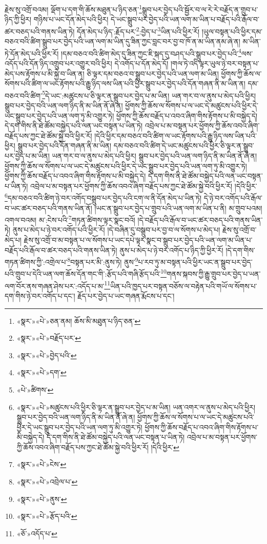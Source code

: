 རྗེས་སུ་འགྲོ་བའམ། ལྡོག་པ་དག་གི་ཆོས་མཐུན་པ་ཉིད་ཅན་\footnote{«སྣར་»«པེ་»ཅན་ནམ། ཆོས་མི་མཐུན་པ་ཉིད་ཅན་}སྒྲུབ་པར་བྱེད་པའི་སྦྱོར་བ་ལ་རེ་རེ་བརྗོད་ན་གྲུབ་པ་ཉིད་ཀྱི་ཕྱིར། གཉིས་པ་ཡང་དོན་མེད་པའི་ཕྱིར། དེ་ཡང་སྒྲུབ་པར་བྱེད་པའི་ཡན་ལག་མ་ཡིན་པ་བརྗོད་པའི་རྒོལ་བ་ཚར་བཅད་པའི་གནས་ཡིན་ཏེ། དོན་མེད་པ་ཉིད་:རྗོད་པར་\footnote{«སྣར་»«པེ་»བརྗོད་པར་}:བྱེད་པ་\footnote{«སྣར་»«པེ་»བྱེད་པའི་}ཡིན་པའི་ཕྱིར་རོ། །ཡུལ་བསྟན་པའི་ཕྱིར་དམ་བཅའ་བའི་ཚིག་སྒྲུབ་པར་བྱེད་པའི་ཡན་ལག་མ་ཡིན་དུ་ཟིན་ཀྱང་བླང་བར་བྱ་བ་ཁོ་ན་མ་ཡིན་ནམ་ཞེ་ན། མ་ཡིན་ཏེ་དོན་མེད་པའི་ཕྱིར་རོ། །དམ་བཅའ་བའི་ཚིག་མེད་དུ་ཟིན་ཀྱང་ཇི་སྐད་དུ་བཤད་པའི་སྒྲུབ་པར་བྱེད་པའི་\footnote{«སྣར་»«པེ་»དག་}ལས་འདོད་པའི་དོན་ཉིད་འགྲུབ་པར་འགྱུར་བའི་ཕྱིར། དེ་འགོད་པ་དོན་མེད་དོ། །གལ་ཏེ་འདི་ལྟར་ཡུལ་ཉེ་བར་བསྟན་པ་མེད་པས་རྟོགས་པ་མི་སྐྱེ་བ་ཡིན་ན། ཅི་ལྟར་དམ་བཅའ་བ་སྒྲུབ་པར་བྱེད་པའི་ཡན་ལག་མ་ཡིན། ཕྱོགས་ཀྱི་ཆོས་ལ་སོགས་པའི་ཚིག་ལ་ཡང་རྟོགས་པའི་རྒྱུ་ཉིད་ལས་ཡིན་པའི་ཕྱིར་སྒྲུབ་པར་བྱེད་པའི་དོན་གཞན་ནི་མ་ཡིན་ན། དམ་བཅའ་བའི་ཚིག་\footnote{«པེ་»ཚིགས་}དེ་ཡང་:མཚུངས་པ་ཅི་ལྟར་ན་སྒྲུབ་པར་བྱེད་པ་མ་ཡིན། ཡན་གར་བ་ལ་ནུས་པ་མེད་པའི་ཕྱིར། སྒྲུབ་པར་བྱེད་བའི་ཡན་ལག་ཉིད་ནི་མ་ཡིན་ནོ་ཞེ་ན། ཕྱོགས་ཀྱི་ཆོས་ལ་སོགས་པ་ལ་ཡང་དེ་མཚུངས་པའི་ཕྱིར་དེ་ཡང་སྒྲུབ་པར་བྱེད་པའི་ཡན་ལག་ཏུ་མི་འགྱུར་ཏེ། ཕྱོགས་ཀྱི་ཆོས་བརྗོད་པ་འབའ་ཞིག་གིས་རྟོགས་པ་མི་བསྐྱེད་དེ། དེ་དག་གིས་ནི་ཐེ་ཚོམ་བསྐྱེད་པའི་ལན་ཡང་བསྟན་པ་ཡིན་ཏེ། འབྲེལ་པ་མ་བསྟན་པར་ཕྱོགས་ཀྱི་ཆོས་འབའ་ཞིག་བརྗོད་པས་ཀྱང་ཐེ་ཚོམ་སྐྱེ་བའི་ཕྱིར་རོ། །དེའི་ཕྱིར་དམ་བཅའ་བའི་ཚིག་ལ་ཡང་རྟོགས་པའི་རྒྱུ་ཉིད་ལས་ཡིན་པའི་ཕྱིར། སྒྲུབ་པར་བྱེད་པའི་དོན་གཞན་ནི་མ་ཡིན། དམ་བཅའ་བའི་ཚིག་དེ་ཡང་མཚུངས་པའི་ཕྱིར་ཅི་ལྟར་ན་སྒྲུབ་པར་བྱེད་པ་མ་ཡིན། ཡན་གར་བ་ལ་ནུས་པ་མེད་པའི་ཕྱིར། སྒྲུབ་པར་བྱེད་པའི་ཡན་ལག་ཉིད་ནི་མ་ཡིན་ནོ་ཞེ་ན། ཕྱོགས་ཀྱི་ཆོས་ལ་སོགས་པ་ལ་ཡང་དེ་མཚུངས་པའི་ཕྱིར་དེ་ཡང་སྒྲུབ་པར་བྱེད་པའི་ཡན་ལག་ཏུ་མི་འགྱུར་ཏེ། ཕྱོགས་ཀྱི་ཆོས་བརྗོད་པ་འབའ་ཞིག་གིས་རྟོགས་པ་མི་བསྐྱེད་དེ། དེ་དག་གིས་ནི་ཐེ་ཚོམ་བསྐྱེད་པའི་ལན་ཡང་བསྟན་པ་ཡིན་ཏེ། འབྲེལ་པ་མ་བསྟན་པར་ཕྱོགས་ཀྱི་ཆོས་འབའ་ཞིག་བརྗོད་པས་ཀྱང་ཐེ་ཚོམ་སྐྱེ་བའི་ཕྱིར་རོ། །དེའི་ཕྱིར་\footnote{«སྣར་»«པེ་»མཚུངས་པའི་ཕྱིར་ཅི་ལྟར་ན་སྒྲུབ་པར་བྱེད་པ་མ་ཡིན། ཡན་འགར་ལ་ནུས་པ་མེད་པའི་ཕྱིར། སྒྲུབ་པར་བྱེད་བའི་ཡན་ལག་ཉིད་ནི་མ་ཡིན་ནོ་ཞེ་ན། ཕྱོགས་ཀྱི་ཆོས་ལ་སོགས་པ་ལ་ཡང་དེ་མཚུངས་པའི་ཕྱིར་དེ་ཡང་སྒྲུབ་པར་བྱེད་པའི་ཡན་ལག་ཏུ་མི་འགྱུར་ཏེ། ཕྱོགས་ཀྱི་ཆོས་བརྗོད་པ་འབའ་ཞིག་གིས་རྟོགས་པ་མི་བསྐྱེད་དེ། དེ་དག་གིས་ནི་ཐེ་ཚོམ་བསྐྱེད་པའི་ལན་ཡང་བསྟན་པ་ཡིན་ཏེ། འབྲེལ་པ་མ་བསྟན་པར་ཕྱོགས་ཀྱི་ཆོས་འབའ་ཞིག་བརྗོད་པས་ཀྱང་ཐེ་ཚོམ་སྐྱེ་བའི་ཕྱིར་རོ། །དེའི་ཕྱིར་}དམ་བཅའ་བའི་ཚིག་ཉེ་བར་འགོད་བསྒྲུབ་པར་བྱེད་པའི་ངག་ལ་ནི་དོན་མེད་པ་ཡིན་ཏེ། དེ་ཉེ་བར་འགོད་པའི་རྒོལ་བ་ཡང་ཚར་བཅད་པའི་གནས་ཡིན་ནོ། །ཡང་ན་སྒྲུབ་པར་བྱེད་པ་གྲུབ་པའི་ཡན་ལག་མ་ཡིན་པ་ནི། མ་གྲུབ་པའམ། འགལ་བའམ། མ་:ངེས་པའི་\footnote{«སྣར་»«པེ་»ངེས་}གཏན་ཚིགས་ལྟར་སྣང་བའོ། །དེ་བརྗོད་པའི་རྒོལ་བ་ཡང་ཚར་བཅད་པའི་གནས་ཡིན་ཏེ། ནུས་པ་མེད་པ་ཉེ་བར་འགོད་པའི་ཕྱིར་རོ། །དེ་བཞིན་དུ་བསྒྲུབ་པར་བྱ་བ་ལ་སོགས་པ་མེད་པ། རྗེས་སུ་འགྲོ་བ་མེད་པ། རྗེས་སུ་འགྲོ་བ་མ་བསྟན་པ་ལ་སོགས་པ་ཡང་དཔེ་ལྟར་སྣང་བ་སྒྲུབ་པར་བྱེད་པའི་ཡན་ལག་མ་ཡིན་པ་བརྗོད་པའི་རྒོལ་བ་ཚར་བཅད་པའི་གནས་ཡིན་ཏེ། ནུས་པ་མེད་པ་ཉེ་བར་འགོད་པ་ཉིད་ཀྱི་ཕྱིར་རོ། །དེ་དག་གིས་གཏན་ཚིགས་ཀྱི་:འགྲེལ་པ་\footnote{«སྣར་»«པེ་»འབྲེལ་པ་}བསྟན་པར་མི་:ནུས་ཏེ། ནུས་\footnote{«སྣར་»«པེ་»ནུས་}པ་རབ་ཏུ་མ་བསྟན་པའི་ཕྱིར་ཡང་ན་སྒྲུབ་པར་བྱེད་པའི་གྲུབ་པ་དེའི་ཡན་ལག་ཆོས་དོན་གང་གི་:རྩོད་པའི་གཞི་རྩོད་པའི་\footnote{«སྣར་»«པེ་»རྩོད་པའི་}གནས་སྐབས་ཀྱི་རྒྱུ་གྲུབ་པར་བྱེད་པ་ཡན་ལག་བོར་ནས་གཞན་ཤེས་པར་:འདོད་པ་མ་\footnote{«ཅོ་»འདོད་པ་}ཡིན་པའི་ཁྱད་པར་བསྟན་བཅོས་ལ་བརྟེན་པའི་གཡོ་ལ་སོགས་པ་དག་གིས་ཉེ་བར་འགོད་པ་དང་། རྗོད་པར་བྱེད་པ་ཡང་གཞན་རྨོངས་པ་དང་། 